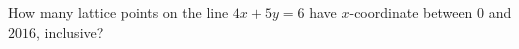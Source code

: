How many lattice points on the line $4x+5y=6$ have $x$-coordinate between $0$ and $2016$, inclusive?
